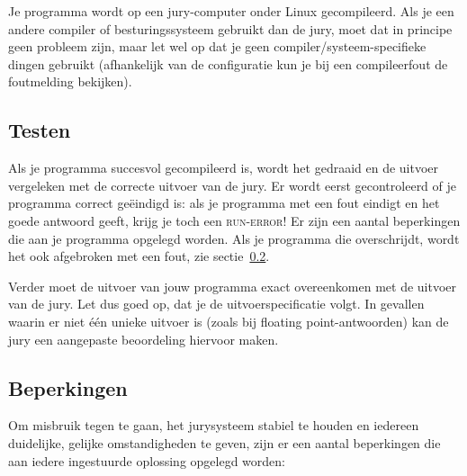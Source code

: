 Je programma wordt op een jury-computer onder Linux gecompileerd.
Als je een andere compiler of besturingssysteem gebruikt dan de jury,
moet dat in principe geen probleem zijn, maar let wel op dat
je geen compiler/systeem-specifieke dingen gebruikt (afhankelijk van
de configuratie kun je bij een compileerfout de foutmelding bekijken).

\subsection{Testen}

Als je programma succesvol gecompileerd is, wordt het gedraaid en de
uitvoer vergeleken met de correcte uitvoer van de jury. Er wordt eerst
gecontroleerd of je programma correct ge\"eindigd is: als je programma
met een fout eindigt en het goede antwoord geeft, krijg je toch een
\textsc{run-error}! Er zijn een aantal beperkingen die aan je programma
opgelegd worden. Als je programma die overschrijdt, wordt het ook
afgebroken met een fout, zie sectie~\ref{runlimits}.

Verder moet de uitvoer van jouw programma exact overeenkomen met de
uitvoer van de jury. Let dus goed op, dat je de uitvoerspecificatie
volgt. In gevallen waarin er niet \'e\'en unieke uitvoer is (zoals bij
floating point-antwoorden) kan de jury een aangepaste beoordeling
hiervoor maken.

\subsection{Beperkingen}\label{runlimits}

Om misbruik tegen te gaan, het jurysysteem stabiel te houden en iedereen
duidelijke, gelijke omstandigheden te geven, zijn er een aantal
beperkingen die aan iedere ingestuurde oplossing opgelegd worden:

